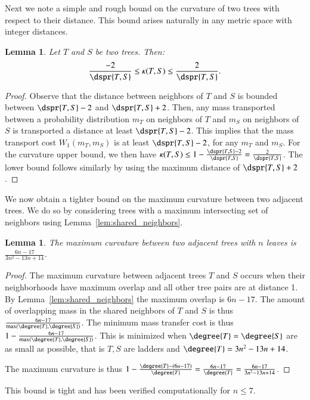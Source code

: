 \documentclass[]{elsarticle}
\newtheorem{lem}[thm]{Lemma}
\newcommand{\curvature}[2][]{%
    \ifthenelse{\equal{#1}{}}%
		{\kappa(#2)}%
		{\kappa_{#1}(#2)}%
}
\begin{document}
Next we note a simple and rough bound on the curvature of two trees with respect to their distance.
This bound arises naturally in any metric space with integer distances.


\begin{lem}
	\label{lem:curvature_distance_bound}
	Let $T$ and $S$ be two trees. Then:
	$$ \frac{-2}{\dspr{T,S}} \le \curvature{T,S} \le \frac{2}{\dspr{T,S}} .$$
\end{lem}
\begin{proof}
	Observe that the distance between neighbors of $T$ and $S$ is bounded between $\dspr{T,S} - 2$ and $\dspr{T,S} + 2$.
	Then, any mass transported between a probability distribution $m_T$ on neighbors of $T$ and $m_S$ on neighbors of $S$ is transported a distance at least $\dspr{T,S} - 2$.
	This implies that the mass transport cost $W_1(m_T,m_S)$ is at least $\dspr{T,S} - 2$, for any $m_T$ and $m_S$.
	For the curvature upper bound, we then have $\curvature{T,S} \le 1 - \frac{\dspr{T,S} - 2}{\dspr{T,S}} = \frac{2}{\dspr{T,S}}$.
	The lower bound follows similarly by using the maximum distance of $\dspr{T,S} + 2$ .
\end{proof}

We now obtain a tighter bound on the maximum curvature between two adjacent trees.
We do so by considering trees with a maximum intersecting set of neighbors using Lemma~\ref{lem:shared_neighbors}.

\begin{lem}
	\label{lem:max_adjacent_curvature}
	The maximum curvature between two adjacent trees with $n$ leaves is $\frac{6n-17}{3n^2-13n+14}$.
\end{lem}
\begin{proof}
The maximum curvature between adjacent trees $T$ and $S$ occurs when their neighborhoods have maximum overlap and all other tree pairs are at distance 1.
By Lemma~\ref{lem:shared_neighbors} the maximum overlap is $6n-17$.
The amount of overlapping mass in the shared neighbors of $T$ and $S$ is thus $\frac{6n-17}{\max(\degree{T},\degree{S})}$.
The minimum mass transfer cost is thus $1 - \frac{6n-17}{\max(\degree{T},\degree{S})}$.
This is minimized when $\degree{T}=\degree{S}$ are as small as possible, that is $T,S$ are ladders and $\degree{T} = 3n^2 - 13n + 14$.

The maximum curvature is thus $1 - \frac{\degree{T} - (6n-17)}{\degree{T}} = \frac{6n - 17}{\degree{T}}= \frac{6n-17}{3n^2-13n+14}$.
\end{proof}
This bound is tight and has been verified computationally for $n \le 7$.
\end{document}
